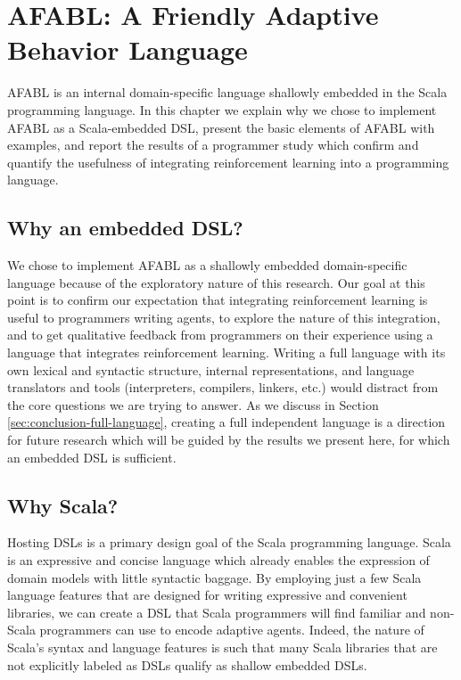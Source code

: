\chapter{AFABL: A Friendly Adaptive Behavior Language}\label{ch:afabl}

AFABL is an internal domain-specific language shallowly embedded in the Scala programming language. In this chapter we explain why we chose to implement AFABL as a Scala-embedded DSL, present the basic elements of AFABL with examples, and report the results of a programmer study which confirm and quantify the usefulness of integrating reinforcement learning into a programming language.

\section{Why an embedded DSL?}

We chose to implement AFABL as a shallowly embedded domain-specific language because of the exploratory nature of this research. Our goal at this point is to confirm our expectation that integrating reinforcement learning is useful to programmers writing agents, to explore the nature of this integration, and to get qualitative feedback from programmers on their experience using a language that integrates reinforcement learning. Writing a full language with its own lexical and syntactic structure, internal representations, and language translators and tools (interpreters, compilers, linkers, etc.) would distract from the core questions we are trying to answer. As we discuss in Section \ref{sec:conclusion-full-language}, creating a full independent language is a direction for future research which will be guided by the results we present here, for which an embedded DSL is sufficient.

\section{Why Scala?}

Hosting DSLs is a primary design goal of the Scala programming language. Scala is an expressive and concise language which already enables the expression of domain models with little syntactic baggage. By employing just a few Scala language features that are designed for writing expressive and convenient libraries, we can create a DSL that Scala programmers will find familiar and non-Scala programmers can use to encode adaptive agents. Indeed, the nature of Scala's syntax and language features is such that many Scala libraries that are not explicitly labeled as DSLs qualify as shallow embedded DSLs.


